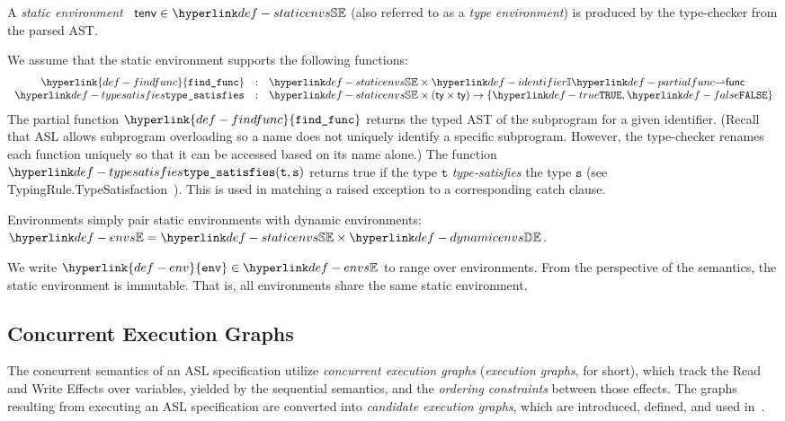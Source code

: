 \documentclass{book}
\newcommand\findfunc[0]{\hyperlink{def-findfunc}{\texttt{find\_func}}}
\newcommand\env[0]{\hyperlink{def-env}{\texttt{env}}}
\newcommand\vs[0]{\texttt{s}}
\newcommand\vt[0]{\texttt{t}}
\begin{document}
\hypertarget{def-staticenvs}{}
\begin{definition}
A \emph{static environment}~\cite{ASLTypingReference} $\tenv \in \staticenvs$ (also referred to as a \emph{type environment})
is produced by the type-checker from the parsed AST.

We assume that the static environment supports the following functions:
\hypertarget{def-findfunc}{}
\hypertarget{def-typesatisfies}{}
\[
  \begin{array}{rcl}
    \findfunc       &:& \staticenvs \times \Identifiers \partialto \func\\
    \typesat  &:& \staticenvs \times (\ty \times \ty) \rightarrow \{\True, \False\}
  \end{array}
\]
The partial function $\findfunc$ returns the typed AST of the subprogram for a given identifier.
(Recall that ASL allows subprogram overloading so a name does not uniquely identify
a specific subprogram.
However, the type-checker renames each function uniquely so that it can be accessed based
on its name alone.)
%
The function $\typesat(\vt, \vs)$ returns true
if the type $\vt$ \emph{type-satisfies} the type $\vs$
(see TypingRule.TypeSatisfaction~\cite{ASLTypingReference}).
This is used in matching a raised exception to a corresponding catch clause.
\end{definition}

\hypertarget{def-envs}{}
\begin{definition}[Environments]
Environments simply pair static environments with dynamic environments:
$\envs = \staticenvs \times \dynamicenvs$.
\end{definition}
\hypertarget{def-env}{}
We write $\env \in \envs$ to range over environments.
%
From the perspective of the semantics, the static environment is immutable.
That is, all environments share the same static environment.

\subsection{Concurrent Execution Graphs \label{sec:concurrentexecutiongraphs}}

The concurrent semantics of an ASL specification utilize \emph{concurrent execution graphs}
(\emph{execution graphs}, for short),
which track the Read and Write Effects over variables, yielded by the sequential semantics,
and the \emph{ordering constraints} between those effects.
The graphs resulting from executing an ASL specification are converted into
\emph{candidate execution graphs}, which are introduced, defined,
and used in~\cite{AlglaveMT14,alglave2016syntax,AlglaveDGHM21}.
\end{document}
